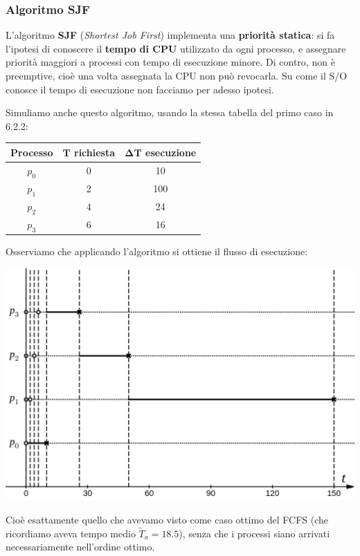 \documentclass[a4paper,11pt]{article}
\begin{document}
\subsubsection{Algoritmo SJF}
L'algoritmo \textbf{SJF} (\textit{Shortest Job First}) implementa una \textbf{priorità statica}: si fa l'ipotesi di conoscere il \textbf{tempo di CPU} utilizzato da ogni processo, e assegnare priorità maggiori a processi con tempo di esecuzione minore. Di contro, non è preemptive, cioè una volta assegnata la CPU non può revocarla. Su come il S/O conosce il tempo di esecuzione non facciamo per adesso ipotesi. 

\par\smallskip

Simuliamo anche questo algoritmo, usando la stessa tabella del primo caso in 6.2.2:
\begin{table}[H]
	\center {}
	\begin{tabular} { c || c | c }
		\bfseries Processo & \bfseries $\mathbf{T}$ richiesta & \bfseries $\mathbf{\Delta T}$ esecuzione \\
		\hline
		$p_0$ & 0 & 10 \\ 
		$p_1$ & 2 & 100 \\ 
		$p_2$ & 4 & 24 \\ 
		$p_3$ & 6 & 16 
	\end{tabular}
\end{table}

\newpage

Osserviamo che applicando l'algoritmo si ottiene il flusso di esecuzione:
\begin{center}
	\includegraphics[scale=0.3]{../figures/sjf.png}
\end{center}
Cioè esattamente quello che avevamo visto come caso ottimo del FCFS (che ricordiamo aveva tempo medio $\tilde{T}_a = 18.5$), senza che i processi siano arrivati necessariamente nell'ordine ottimo.
\end{document}
